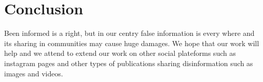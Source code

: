 \documentclass[12pt,sigconf,letterpaper,anonymous,nonacm]{acmart}
\begin{document}
\section{Conclusion}
Been informed is a right, but in our centry false information is every where and its sharing in communities may cause huge damages. We hope that our work will help and we attend to extend our work on other social plateforms such as instagram pages and other types of publications sharing disinformation such as images and videos.
\printbibliography
\end{document}

